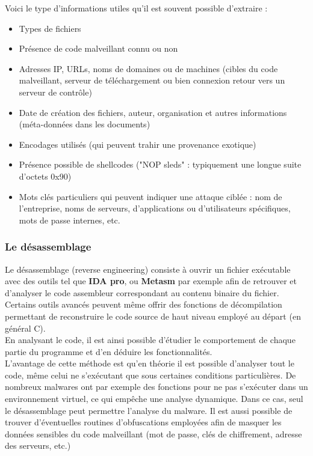 Voici le type d'informations utiles qu'il est souvent possible d'extraire :\\
\begin{itemize}


\item Types de fichiers
\item Présence de code malveillant connu ou non
\item Adresses IP, URLs, noms de domaines ou de machines (cibles du code malveillant, serveur de téléchargement ou bien connexion retour vers un serveur de contrôle)
\item Date de création des fichiers, auteur, organisation et autres informations (méta-données dans les documents)
\item Encodages utilisés (qui peuvent trahir une provenance exotique)
\item Présence possible de shellcodes ("NOP sleds" : typiquement une longue suite d'octets 0x90)
\item Mots clés particuliers qui peuvent indiquer une attaque ciblée : nom de l'entreprise, noms de serveurs, d'applications ou d'utilisateurs spécifiques, mots de passe internes, etc.

\end{itemize}
\subsubsection{Le désassemblage}
Le désassemblage (reverse engineering) consiste à ouvrir un fichier exécutable avec des outils tel que \textbf{IDA pro}, ou \textbf{Metasm} par exemple afin de retrouver et d'analyser le code assembleur correspondant au contenu binaire du fichier. Certains outils avancés peuvent même offrir des fonctions de décompilation permettant de reconstruire le code source de haut niveau employé au départ (en général C).\\
En analysant le code, il est ainsi possible d'étudier le comportement de chaque partie du programme et d'en déduire les fonctionnalités.\\

L'avantage de cette méthode est qu'en théorie il est possible d'analyser tout le code, même celui ne s'exécutant que sous certaines conditions particulières. De nombreux malwares ont par exemple des fonctions pour ne pas s'exécuter dans un environnement virtuel, ce qui empêche une analyse dynamique. Dans ce cas, seul le désassemblage peut permettre l'analyse du malware. Il est aussi possible de trouver d'éventuelles routines d'obfuscations employées afin de masquer les données sensibles du code malveillant (mot de passe, clés de chiffrement, adresse des serveurs, etc.)\\

